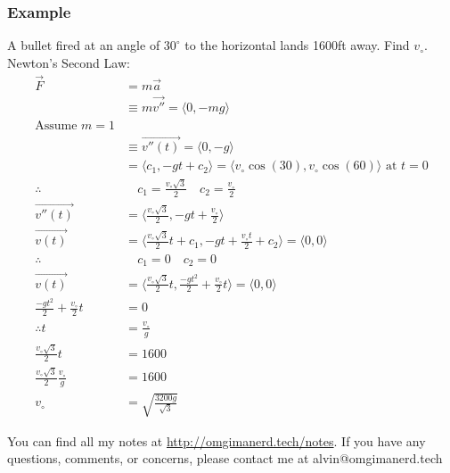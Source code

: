 \documentclass[letterpaper, 12pt]{math}
\begin{document}
\subsubsection*{Example}
A bullet fired at an angle of \( 30^{\circ} \) to the horizontal lands 1600ft
away. Find \( v_{\circ} \). \\
Newton's Second Law:
\begin{align*}
  \vec{F} &= m\vec{a} \\
  &\equiv m\vec{v''} = \langle0,-mg\rangle \\
  \text{Assume } m = 1 \\
  &\equiv \overrightarrow{v''(t)} = \langle0,-g\rangle \\
  &= \langle c_1,-gt+c_2\rangle = \langle
    v_{\circ}\cos(30),v_{\circ}\cos(60)\rangle \text{ at } t = 0 \\
  \therefore & \quad c_1 = \frac{v_{\circ}\sqrt{3}}{2} \quad
    c_2 = \frac{v_{\circ}}{2} \\
  \overrightarrow{v''(t)} &= \langle\frac{v_{\circ}\sqrt{3}}{2},-gt+
    \frac{v_{\circ}}{2}\rangle \\
  \overrightarrow{v(t)} &= \langle\frac{v_{\circ}\sqrt{3}}{2}t+c_1,-gt+
    \frac{v_{\circ}t}{2}+c_2\rangle = \langle0,0\rangle \\
  \therefore & \quad c_1 = 0 \quad c_2 = 0 \\
  \overrightarrow{v(t)} &= \langle\frac{v_{\circ}\sqrt{3}}{2}t,
    \frac{-gt^2}{2}+\frac{v_{\circ}}{2}t\rangle = \langle0,0\rangle \\
  \frac{-gt^2}{2}+\frac{v_{\circ}}{2}t &= 0 \\
  \therefore t &= \frac{v_{\circ}}{g} \\
  \frac{v_{\circ}\sqrt{3}}{2}t &= 1600 \\
  \frac{v_{\circ}\sqrt{3}}{2}\frac{v_{\circ}}{g} &= 1600 \\
  v_{\circ} &= \sqrt{\frac{3200g}{\sqrt{3}}}
\end{align*}

\begin{center}
  You can find all my notes at \url{http://omgimanerd.tech/notes}. If you have
  any questions, comments, or concerns, please contact me at
  alvin@omgimanerd.tech
\end{center}
\end{document}
